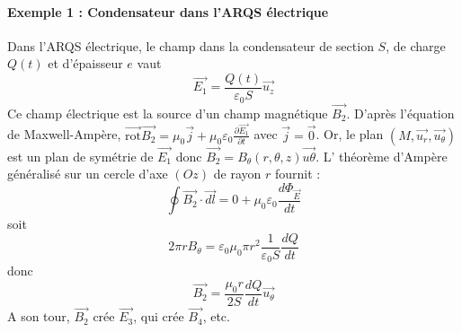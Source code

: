 \documentclass[french]{book}
\theoremstyle{plain}
\theoremstyle{definition}
\theoremstyle{remark}
\newcommand{\rot}{\overrightarrow{\text{rot}}}
\begin{document}
\paragraph{Exemple 1 : Condensateur dans l'ARQS électrique}
Dans l'ARQS électrique, le champ dans la condensateur de section $S$, de charge $Q(t)$ et d'épaisseur $e$ vaut $$\overrightarrow{E_1}=\frac{Q(t)}{\varepsilon_0 S}\overrightarrow{u_z}$$ Ce champ électrique est la source d'un champ magnétique $\overrightarrow{B_2}$. D'après l'équation de Maxwell-Ampère, $\displaystyle \rot\overrightarrow{B_2}=\mu_0\overrightarrow{j}+\mu_0\varepsilon_0\frac{\partial \overrightarrow{E_1}}{\partial t}$ avec $\overrightarrow{j}=\overrightarrow{0}$. Or, le plan $(M,\overrightarrow{u_r},\overrightarrow{u_\theta})$ est un plan de symétrie de $\overrightarrow{E_1}$ donc $\overrightarrow{B_2}=B_\theta(r,\theta,z)\overrightarrow{u\theta}$. L' théorème d'Ampère généralisé sur un cercle d'axe $(Oz)$ de rayon $r$ fournit : $$\oint\overrightarrow{B_2}\cdot\overrightarrow{dl}=0+\mu_0\varepsilon_0\frac{d\Phi_{\overrightarrow{E}}}{dt}$$ soit $$2\pi rB_\theta=\varepsilon_0\mu_0\pi r^2\frac{1}{\varepsilon_0 S}\frac{dQ}{dt}$$ donc $$\overrightarrow{B_2}=\frac{\mu_0 r}{2S}\frac{dQ}{dt}\overrightarrow{u_\theta}$$ A son tour, $\overrightarrow{B_2}$ crée $\overrightarrow{E_3}$, qui crée $\overrightarrow{B_4}$, etc.
\end{document}
